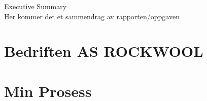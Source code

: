 \documentclass[12pt,a4paper,twoside,openright]{report}
\begin{document}
\pagestyle{empty}
\vfill
\vfill
\indent \newline
\Huge Executive Summary \\
\normalsize 
\indent \newline
Her kommer det et sammendrag av rapporten/oppgaven \\
\vfill
\cleardoublepage

\pagestyle{fancy}

\setcounter{tocdepth}{2}
\tableofcontents
{}


\cleardoublepage
{}
\setcounter{page}{1}
\chapter{Bedriften AS ROCKWOOL}

\cleardoublepage

\chapter{Min Prosess}

\cleardoublepage

\renewcommand\bibname{Referanseliste}
\cleardoublepage
\end{document}
